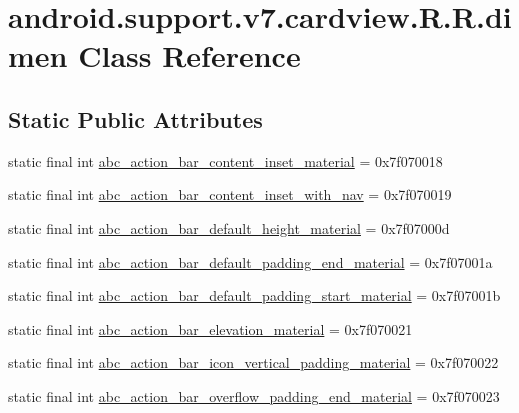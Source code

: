 \hypertarget{classandroid_1_1support_1_1v7_1_1cardview_1_1_r_1_1dimen}{
\section{android.support.v7.cardview.R.R.dimen Class Reference}
\label{classandroid_1_1support_1_1v7_1_1cardview_1_1_r_1_1dimen}
}
\subsection*{Static Public Attributes}
\begin{CompactItemize}
\item 
static final int \hyperlink{classandroid_1_1support_1_1v7_1_1cardview_1_1_r_1_1dimen_ef11321a0dcc51add265295f53b4fdad}{abc\_\-action\_\-bar\_\-content\_\-inset\_\-material} = 0x7f070018
\item 
static final int \hyperlink{classandroid_1_1support_1_1v7_1_1cardview_1_1_r_1_1dimen_eddcac79da0438411823a87056f24205}{abc\_\-action\_\-bar\_\-content\_\-inset\_\-with\_\-nav} = 0x7f070019
\item 
static final int \hyperlink{classandroid_1_1support_1_1v7_1_1cardview_1_1_r_1_1dimen_d1b642c1bc2344df1ecb7d78ac5f47ac}{abc\_\-action\_\-bar\_\-default\_\-height\_\-material} = 0x7f07000d
\item 
static final int \hyperlink{classandroid_1_1support_1_1v7_1_1cardview_1_1_r_1_1dimen_c0d64a8523af92cfeaa24dc5f5144b45}{abc\_\-action\_\-bar\_\-default\_\-padding\_\-end\_\-material} = 0x7f07001a
\item 
static final int \hyperlink{classandroid_1_1support_1_1v7_1_1cardview_1_1_r_1_1dimen_91bd7cdab83712c710c09d4a2ac6d69c}{abc\_\-action\_\-bar\_\-default\_\-padding\_\-start\_\-material} = 0x7f07001b
\item 
static final int \hyperlink{classandroid_1_1support_1_1v7_1_1cardview_1_1_r_1_1dimen_f8c029b637cfb4fbd296bd46e9b51a42}{abc\_\-action\_\-bar\_\-elevation\_\-material} = 0x7f070021
\item 
static final int \hyperlink{classandroid_1_1support_1_1v7_1_1cardview_1_1_r_1_1dimen_a3c8f7452dcd9fde92a604ffed7cfa5a}{abc\_\-action\_\-bar\_\-icon\_\-vertical\_\-padding\_\-material} = 0x7f070022
\item 
static final int \hyperlink{classandroid_1_1support_1_1v7_1_1cardview_1_1_r_1_1dimen_a75c755e43f7cced783adef657d081cd}{abc\_\-action\_\-bar\_\-overflow\_\-padding\_\-end\_\-material} = 0x7f070023

\end{CompactItemize}
